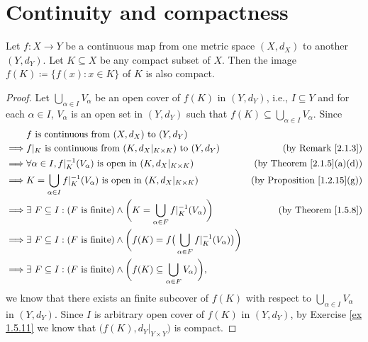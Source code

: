 \section{Continuity and compactness}\label{sec 2.3}

\begin{theorem}\label{2.3.1}
    Let \(f : X \to Y\) be a continuous map from one metric space \((X, d_X)\) to another \((Y, d_Y)\).
    Let \(K \subseteq X\) be any compact subset of \(X\).
    Then the image \(f(K) \coloneqq \{f(x) : x \in K\}\) of \(K\) is also compact.
\end{theorem}

\begin{proof}
    Let \(\bigcup_{\alpha \in I} V_\alpha\) be an open cover of \(f(K)\) in \((Y, d_Y)\), i.e., \(I \subseteq Y\) and for each \(\alpha \in I\), \(V_{\alpha}\) is an open set in \((Y, d_Y)\) such that \(f(K) \subseteq \bigcup_{\alpha \in I} V_\alpha\).
    Since
    \begin{align*}
                 & f \text{ is continuous from } (X, d_X) \text{ to } (Y, d_Y)                                                                                                             \\
        \implies & f|_K \text{ is continuous from } (K, d_X|_{K \times K}) \text{ to } (Y, d_Y)                                                  & \text{(by Remark \ref{2.1.3})}          \\
        \implies & \forall \alpha \in I, f|_K^{-1}(V_\alpha) \text{ is open in } (K, d_X|_{K \times K})                                          & \text{(by Theorem \ref{2.1.5}(a)(d))}   \\
        \implies & K = \bigcup_{\alpha \in I} f|_K^{-1}(V_\alpha) \text{ is open in } (K, d_X|_{K \times K})                                     & \text{(by Proposition \ref{1.2.15}(g))} \\
        \implies & \exists\ F \subseteq I : (F \text{ is finite}) \land \bigg(K = \bigcup_{\alpha \in F} f|_K^{-1}(V_\alpha)\bigg)               & \text{(by Theorem \ref{1.5.8})}         \\
        \implies & \exists\ F \subseteq I : (F \text{ is finite}) \land \bigg(f(K) = f\big(\bigcup_{\alpha \in F} f|_K^{-1}(V_\alpha)\big)\bigg)                                           \\
        \implies & \exists\ F \subseteq I : (F \text{ is finite}) \land \bigg(f(K) \subseteq \bigcup_{\alpha \in F} V_\alpha)\bigg),
    \end{align*}
    we know that there exists an finite subcover of \(f(K)\) with respect to \(\bigcup_{\alpha \in I} V_\alpha\) in \((Y, d_Y)\).
    Since \(I\) is arbitrary open cover of \(f(K)\) in \((Y, d_Y)\), by Exercise \ref{ex 1.5.11} we know that \(\big(f(K), d_Y|_{Y \times Y}\big)\) is compact.
\end{proof}

